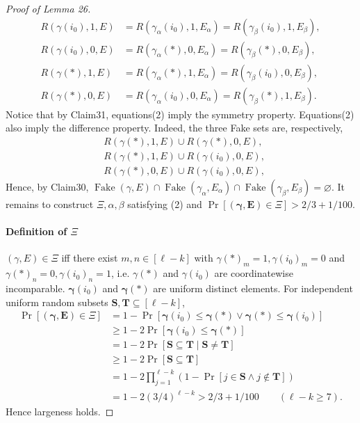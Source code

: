 \documentclass[10pt,a4paper]{article}
\begin{document}
\begin{proof}[Proof of Lemma 26]
\begin{equation}
\begin{aligned}
R(\gamma(i_0),1,E)&=R(\gamma_\alpha(i_0),1,E_\alpha)=R(\gamma_\beta(i_0),1,E_\beta),\\
R(\gamma(i_0),0,E)&=R(\gamma_\alpha(*),0,E_\alpha)=R(\gamma_\beta(*),0,E_\beta),\\
R(\gamma(*),1,E)&=R(\gamma_\alpha(*),1,E_\alpha)=R(\gamma_\beta(i_0),0,E_\beta),\\
R(\gamma(*),0,E)&=R(\gamma_\alpha(i_0),0,E_\alpha)=R(\gamma_\beta(*),1,E_\beta).
\end{aligned}\tag{2}
\end{equation}
Notice that by Claim31, equations(2) imply the symmetry property. Equations(2) also imply the difference property. Indeed, the three Fake sets are, respectively,
\begin{align*}
& R(\gamma(*),1,E)\cup R(\gamma(*),0,E),\\
& R(\gamma(*),1,E)\cup R(\gamma(i_0),0,E),\\
& R(\gamma(*),0,E)\cup R(\gamma(i_0),0,E),
\end{align*}
Hence, by Claim30, $\operatorname{Fake}(\gamma,E)\cap\operatorname{Fake}(\gamma_\alpha,E_\alpha)\cap\operatorname{Fake}(\gamma_\beta,E_\beta)=\varnothing$.
It remains to construct $\Xi,\alpha,\beta$ satisfying (2) and $\Pr[(\boldsymbol\gamma,\mathbf E)\in\Xi]>2/3+1/100$.
\paragraph{Definition of $\Xi$}
$(\gamma,E)\in\Xi$ iff there exist $m,n\in[\ell-k]$ with $\gamma(*)_m=1,\gamma(i_0)_m=0$ and $\gamma(*)_n=0,\gamma(i_0)_n=1$, i.e. $\gamma(*)$ and $\gamma(i_0)$ are coordinatewise incomparable.
$\boldsymbol\gamma(i_0)$ and $\boldsymbol\gamma(*)$ are uniform distinct elements. For independent uniform random subsets $\mathbf S,\mathbf T\subseteq[\ell-k]$,
\begin{align*}
\Pr[(\boldsymbol\gamma,\mathbf E)\in\Xi]
&=1-\Pr[\boldsymbol\gamma(i_0)\le\boldsymbol\gamma(*)\vee\boldsymbol\gamma(*)\le\boldsymbol\gamma(i_0)]\\
&\ge1-2\Pr[\boldsymbol\gamma(i_0)\le\boldsymbol\gamma(*)]\\
&=1-2\Pr[\mathbf S\subseteq\mathbf T\mid\mathbf S\ne\mathbf T]\\
&\ge1-2\Pr[\mathbf S\subseteq\mathbf T]\\
&=1-2\prod_{j=1}^{\ell-k}(1-\Pr[j\in\mathbf S\wedge j\notin\mathbf T])\\
&=1-2(3/4)^{\ell-k}>2/3+1/100\qquad(\ell-k\ge7).
\end{align*}
Hence largeness holds.

\end{proof}
\end{document}

